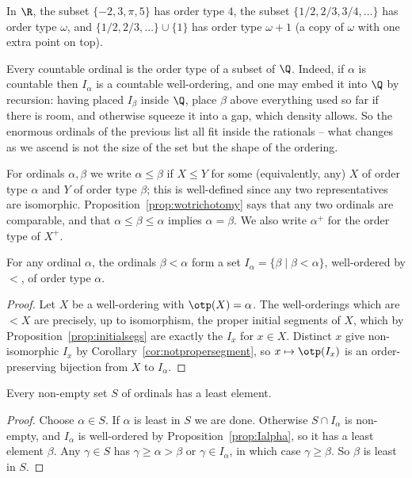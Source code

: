 \begin{example}
  In $\R$, the subset $\{-2, 3, \pi, 5\}$ has order type $4$, the subset $\{1/2, 2/3, 3/4, \dots\}$ has order type $\omega$, and $\{1/2, 2/3, \dots\} \cup \{1\}$ has order type $\omega + 1$ (a copy of $\omega$ with one extra point on top).
\end{example}

\begin{example}
  Every countable ordinal is the order type of a subset of $\Q$. Indeed, if $\alpha$ is countable then $I_\alpha$ is a countable well-ordering, and one may embed it into $\Q$ by recursion: having placed $I_\beta$ inside $\Q$, place $\beta$ above everything used so far if there is room, and otherwise squeeze it into a gap, which density allows. So the enormous ordinals of the previous list all fit inside the rationals -- what changes as we ascend is not the size of the set but the shape of the ordering.
\end{example}

For ordinals $\alpha, \beta$ we write $\alpha \leq \beta$ if $X \leq Y$ for some (equivalently, any) $X$ of order type $\alpha$ and $Y$ of order type $\beta$; this is well-defined since any two representatives are isomorphic. Proposition~\ref{prop:wotrichotomy} says that any two ordinals are comparable, and that $\alpha \leq \beta \leq \alpha$ implies $\alpha = \beta$. We also write $\alpha^+$ for the order type of $X^+$.

\begin{proposition}\label{prop:Ialpha}
  For any ordinal $\alpha$, the ordinals $\beta < \alpha$ form a set $I_\alpha = \{\beta \mid \beta < \alpha\}$, well-ordered by $<$, of order type $\alpha$.
\end{proposition}
\begin{proof}
  Let $X$ be a well-ordering with $\otp(X) = \alpha$. The well-orderings which are $< X$ are precisely, up to isomorphism, the proper initial segments of $X$, which by Proposition~\ref{prop:initialsegs} are exactly the $I_x$ for $x \in X$. Distinct $x$ give non-isomorphic $I_x$ by Corollary~\ref{cor:notpropersegment}, so $x \mapsto \otp(I_x)$ is an order-preserving bijection from $X$ to $I_\alpha$.
\end{proof}

\begin{proposition}\label{prop:ordinalswo}
  Every non-empty set $S$ of ordinals has a least element.
\end{proposition}
\begin{proof}
  Choose $\alpha \in S$. If $\alpha$ is least in $S$ we are done. Otherwise $S \cap I_\alpha$ is non-empty, and $I_\alpha$ is well-ordered by Proposition~\ref{prop:Ialpha}, so it has a least element $\beta$. Any $\gamma \in S$ has $\gamma \geq \alpha > \beta$ or $\gamma \in I_\alpha$, in which case $\gamma \geq \beta$. So $\beta$ is least in $S$.
\end{proof}

